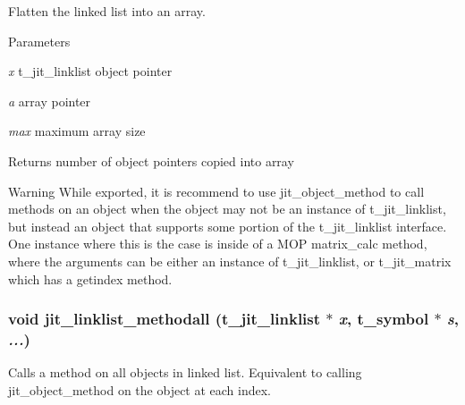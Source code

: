 Flatten the linked list into an array. 
\begin{DoxyParams}{Parameters}
\item[{\em x}]t\_\-jit\_\-linklist object pointer \item[{\em a}]array pointer \item[{\em max}]maximum array size\end{DoxyParams}
\begin{DoxyReturn}{Returns}
number of object pointers copied into array
\end{DoxyReturn}
\begin{DoxyWarning}{Warning}
While exported, it is recommend to use jit\_\-object\_\-method to call methods on an object when the object may not be an instance of t\_\-jit\_\-linklist, but instead an object that supports some portion of the t\_\-jit\_\-linklist interface. One instance where this is the case is inside of a MOP matrix\_\-calc method, where the arguments can be either an instance of t\_\-jit\_\-linklist, or t\_\-jit\_\-matrix which has a getindex method. 
\end{DoxyWarning}
\hypertarget{group__linklistmod_gaeba2a3ea3a843bcae52247957926b2bc}{
\subsubsection[{jit\_\-linklist\_\-methodall}]{\setlength{\rightskip}{0pt plus 5cm}void jit\_\-linklist\_\-methodall (t\_\-jit\_\-linklist $\ast$ {\em x}, \/  {\bf t\_\-symbol} $\ast$ {\em s}, \/   {\em ...})}}
\label{group__linklistmod_gaeba2a3ea3a843bcae52247957926b2bc}


Calls a method on all objects in linked list. Equivalent to calling jit\_\-object\_\-method on the object at each index.


